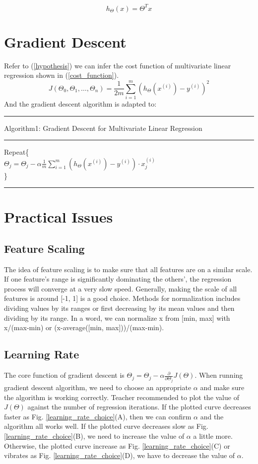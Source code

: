 \documentclass{article}
\begin{document}
\begin{equation}\label{hypothesis_refine}
 h_{\Theta}(x) = {\Theta}^{T}x
\end{equation}

\section{Gradient Descent}
Refer to (\ref{hypothesis}) we can infer the cost function of multivariate linear regression shown in (\ref{cost_function}).
\begin{equation}\label{cost_function}
  J(\Theta_{0}, \Theta_{1}, \ldots , \Theta_{n}) = \frac{1}{2m} \sum_{i=1}^{m} (h_\Theta({x^{(i)}})-y^{(i)})^2
\end{equation}
And the gradient descent algorithm is adapted to:
\medskip
\hrule
\smallskip
Algorithm1: Gradient Descent for Multivariate Linear Regression
\smallskip
\hrule
\smallskip
Repeat\{\\
$\Theta_j=\Theta_j - \alpha \frac{1}{m} \sum_{i=1}^{m}(h_\Theta(x^{(i)})-y^{(i)}) \cdot x^{(i)}_{j}$\\
\}\\
\hrule

\section{Practical Issues}
\subsection{Feature Scaling}
The idea of feature scaling is to make sure that all features are on a similar scale. If one feature's range is significantly dominating the others', the regression process will converge at a very slow speed. Generally, making the scale of all features is around [-1, 1] is a good choice. Methods for normalization includes dividing values by its ranges or first decreasing by its mean values and then dividing by its range. In a word, we can normalize x from [min, max] with x/(max-min) or (x-average([min, max]))/(max-min).
\subsection{Learning Rate}
The core function of gradient descent is $\Theta_j =\Theta_j - \alpha\frac{\partial}{\partial \Theta_j}J(\Theta)$. When running gradient descent algorithm, we need to choose an appropriate $\alpha$ and make sure the algorithm is working correctly. Teacher recommended to plot the value of $J(\Theta)$ against the number of regression iterations. If the plotted curve decreases faster as Fig. \ref{learning_rate_choice}(A), then we can confirm $\alpha$ and the algorithm all works well. If the plotted curve decreases slow as Fig. \ref{learning_rate_choice}(B), we need to increase the value of $\alpha$ a little more. Otherwise, the plotted curve increase as Fig. \ref{learning_rate_choice}(C) or vibrates as Fig. \ref{learning_rate_choice}(D), we have to decrease the value of $\alpha$.
\end{document}
